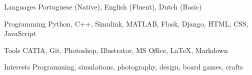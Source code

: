 \begin{cvskills}

  \cvskill
    {Languages} %
    {Portuguese (Native), English (Fluent), Dutch (Basic)} %

  \cvskill
    {Programming} %
    {Python, C++, Simulink, MATLAB, Flask, Django, HTML, CSS, JavaScript} %

  \cvskill
    {Tools} %
    {CATIA, Git, Photoshop, Illustrator, MS Office, LaTeX, Markdown} %

  \cvskill
    {Interests} %
    {Programming, simulations, photography, design, board games, crafts} %

\end{cvskills}